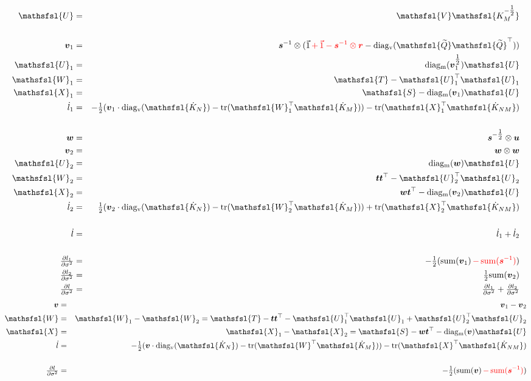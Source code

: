 \documentclass[10pt]{article}
\newcommand{\red}{\textcolor{red}}
\newcommand{\blue}{\textcolor{blue}}
\newcommand{\onehalf}{\tfrac{1}{2}}
\newcommand{\mat}[1]{\mbox{$\mathsfsl{#1}$}}
\newcommand{\myvec}[1]{\mbox{\boldmath$#1$}}
\newcommand{\diagv}[1]{\mathrm{diag_v}(#1)}
\newcommand{\diagm}[1]{\mathrm{diag_m}(#1)}
\newcommand{\trace}[1]{\mathrm{tr}(#1)}
\newcommand{\transv}[1]{\myvec{#1}^\top}
\newcommand{\transm}[1]{\mat{#1}^\top}
\newcommand{\ichol}[1]{\mat{#1^{-\onehalf}}}
\newcommand{\dKm}{\mat{\dot{K}_M}}
\newcommand{\dKn}{\mat{\dot{K}_N}}
\newcommand{\dKnm}{\mat{\dot{K}_{NM}}}
\newcommand{\dl}{\dot{l}}
\newcommand{\vecu}{\myvec{u}}
\newcommand{\vecr}{\myvec{r}}
\newcommand{\vect}{\myvec{t}}
\newcommand{\vecw}{\myvec{w}}
\newcommand{\vecv}{\myvec{v}}
\newcommand{\vecvx}{\myvec{v}_1}
\newcommand{\vecvy}{\myvec{v}_2}
\newcommand{\vecis}{\myvec{s}^{-1}}
\newcommand{\veciss}{\myvec{s}^{-\onehalf}}
\newcommand{\matQn}{\mat{\widetilde{Q}}}
\newcommand{\tmatQn}{\transm{\widetilde{Q}}}
\newcommand{\matS}{\mat{S}}
\newcommand{\matT}{\mat{T}}
\newcommand{\matU}{\mat{U}}
\newcommand{\matUx}{\mat{U}_1}
\newcommand{\matUy}{\mat{U}_2}
\newcommand{\matW}{\mat{W}}
\newcommand{\matWx}{\mat{W}_1}
\newcommand{\matX}{\mat{X}}
\newcommand{\matXx}{\mat{X}_1}
\newcommand{\matWy}{\mat{W}_2}
\newcommand{\matXy}{\mat{X}_2}
\begin{document}
\begin{eqnarray*}
\matU & = & \mat{V} \ichol{K_M} \\
\\
\vecvx & = & \vecis \otimes (\vec{1} \red{\, + \, \vec{1} - \vecis \otimes \vecr} - \diagv{\matQn\tmatQn}) \\
\matUx & = & \diagm{\vecvx^{\onehalf}} \matU \\
\matWx & = & \matT - \matUx^\top\matUx \\
\matXx & = & \matS - \diagm{\vecvx}\matU \\
\dl_1 & = & -\onehalf(\vecvx \cdot \diagv{\dKn} - \trace{\transm{W}_1\dKm}) - \trace{\transm{X}_1\dKnm} \\
\\
\vecw & = & \veciss \otimes \vecu \\
\vecvy & = & \vecw \otimes \vecw \\
\matUy & = & \diagm{\vecw} \matU \\
\matWy & = & \vect \vect^\top - \matUy^\top\matUy \\
\matXy & = & \vecw\vect^\top - \diagm{\vecvy}\matU \\
\dl_2 & = & \onehalf(\vecvy \cdot \diagv{\dKn} - \trace{\transm{W}_2\dKm}) + \trace{\transm{X}_2\dKnm} \\
\\
\dl & = & \dl_1 + \dl_2 \\
\\
\tfrac{\partial l_1}{\partial\sigma^2} & = & -\onehalf(\mathrm{sum}(\vecvx) \red{\, - \, \mathrm{sum}(\vecis)}) \\
\tfrac{\partial l_2}{\partial\sigma^2} & = & \onehalf\mathrm{sum}(\vecvy) \\
\tfrac{\partial l}{\partial\sigma^2} & = & \tfrac{\partial l_1}{\partial\sigma^2} + \tfrac{\partial l_2}{\partial\sigma^2}
\end{eqnarray*}
\blue{
\begin{eqnarray*}
\vecv & = & \vecvx - \vecvy  \\
\matW & = & \matWx - \matWy = \matT - \vect \transv{t} - \matUx^\top\matUx + \matUy^\top\matUy \\
\matX & = & \matXx - \matXy = \matS - \vecw \transv{t} - \diagm{\vecv}\matU \\
\dl & = & -\onehalf(\vecv \cdot \diagv{\dKn} - \trace{\transm{W}\dKm}) - \trace{\transm{X}\dKnm} \\
\\
\tfrac{\partial l}{\partial\sigma^2} & = & -\onehalf(\mathrm{sum}(\vecv) \red{\, - \, \mathrm{sum}(\vecis)}) \\
\end{eqnarray*}
}
\end{document}
